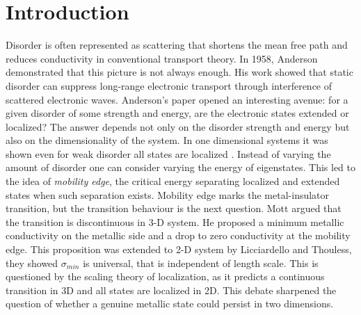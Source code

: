 \section*{Introduction}
Disorder is often represented as scattering that shortens the mean free path and reduces conductivity in conventional transport theory. In 1958, Anderson demonstrated that this picture is not always enough. His work showed that static disorder can suppress long-range electronic transport through interference of scattered electronic waves. Anderson's paper opened an interesting avenue: for a given disorder of some strength and energy, are the electronic states extended or localized? The answer depends not only on the disorder strength and energy but also on the dimensionality of the system\cite{Anderson1958}. In one dimensional systems it was shown even for weak disorder all states are localized \cite{Mott01041961,10.1098/rspa.1963.0148}. Instead of varying the amount of disorder one can consider varying the energy of eigenstates. This led to the idea of \textit{mobility edge}, the critical energy separating localized and extended states when such separation exists.\cite{https://doi.org/10.1002/pssb.19670210135} Mobility edge marks the metal-insulator transition, but the transition behaviour is the next question. Mott argued that the transition is discontinuous in 3-D system. He proposed a minimum metallic conductivity on the metallic side and a drop to zero conductivity at the mobility edge\cite{Mott1974}. This proposition was extended to 2-D system by Licciardello and Thouless, they showed $\sigma_{min}$ is universal, that is independent of length scale\cite{PhysRevLett.35.1475}. This is questioned by the scaling theory of localization, as it predicts a continuous transition in 3D and all states are localized in 2D. This debate sharpened the question of whether a genuine metallic state could persist in two dimensions.\cite{LeeRamakrishnan1985} 

